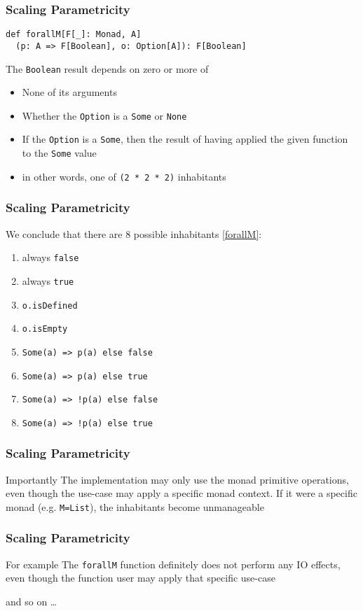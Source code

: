 \begin{frame}[fragile]
\frametitle{Scaling Parametricity}
\begin{lstlisting}[style=scala]
def forallM[F[_]: Monad, A]
  (p: A => F[Boolean], o: Option[A]): F[Boolean]
\end{lstlisting}
\begin{theorem}
  The \lstinline{Boolean} result depends on zero or more of
  \begin{itemize}
    \item None of its arguments
    \item Whether the \lstinline{Option} is a \lstinline{Some} or \lstinline{None}
    \item If the \lstinline{Option} is a \lstinline{Some}, then the result of having applied the given function to the \lstinline{Some} value
    \item in other words, one of \lstinline{(2 * 2 * 2)} inhabitants
  \end{itemize}
\end{theorem}
\end{frame}

\begin{frame}[fragile]
\frametitle{Scaling Parametricity}
  We conclude that there are 8 possible inhabitants \ref{forallM}:
  \begin{enumerate}
    \item always \lstinline{false}
    \item always \lstinline{true}
    \item \lstinline{o.isDefined}
    \item \lstinline{o.isEmpty}
    \item \lstinline{Some(a) => p(a) else false}
    \item \lstinline{Some(a) => p(a) else true}
    \item \lstinline{Some(a) => !p(a) else false}
    \item \lstinline{Some(a) => !p(a) else true}
  \end{enumerate}
\end{frame}

\begin{frame}[fragile]
\frametitle{Scaling Parametricity}
  \begin{block}{Importantly}
  The implementation may only use the monad primitive operations, even though the use-case may apply a specific monad context. If it were a specific monad (e.g. \lstinline{M=List}), the inhabitants become unmanageable
  \end{block}
\end{frame}

\begin{frame}[fragile]
\frametitle{Scaling Parametricity}
  \begin{block}{For example}
  The \lstinline{forallM} function definitely does not perform any IO effects, even though the function user may apply that specific use-case
  \end{block}
  and so on \ldots
\end{frame}
